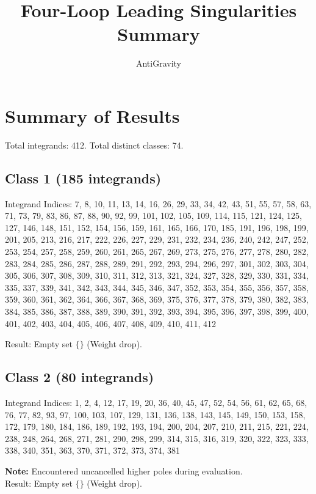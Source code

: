 \documentclass[11pt,a4paper]{article}
\title{Four-Loop Leading Singularities Summary}
\author{AntiGravity}
\begin{document}
\maketitle

\section{Summary of Results}
Total integrands: 412. Total distinct classes: 74.

\subsection*{Class 1 (185 integrands)}
Integrand Indices: 7, 8, 10, 11, 13, 14, 16, 26, 29, 33, 34, 42, 43, 51, 55, 57, 58, 63, 71, 73, 79, 83, 86, 87, 88, 90, 92, 99, 101, 102, 105, 109, 114, 115, 121, 124, 125, 127, 146, 148, 151, 152, 154, 156, 159, 161, 165, 166, 170, 185, 191, 196, 198, 199, 201, 205, 213, 216, 217, 222, 226, 227, 229, 231, 232, 234, 236, 240, 242, 247, 252, 253, 254, 257, 258, 259, 260, 261, 265, 267, 269, 273, 275, 276, 277, 278, 280, 282, 283, 284, 285, 286, 287, 288, 289, 291, 292, 293, 294, 296, 297, 301, 302, 303, 304, 305, 306, 307, 308, 309, 310, 311, 312, 313, 321, 324, 327, 328, 329, 330, 331, 334, 335, 337, 339, 341, 342, 343, 344, 345, 346, 347, 352, 353, 354, 355, 356, 357, 358, 359, 360, 361, 362, 364, 366, 367, 368, 369, 375, 376, 377, 378, 379, 380, 382, 383, 384, 385, 386, 387, 388, 389, 390, 391, 392, 393, 394, 395, 396, 397, 398, 399, 400, 401, 402, 403, 404, 405, 406, 407, 408, 409, 410, 411, 412

Result: Empty set $\{\}$ (Weight drop).\\[1em]

\subsection*{Class 2 (80 integrands)}
Integrand Indices: 1, 2, 4, 12, 17, 19, 20, 36, 40, 45, 47, 52, 54, 56, 61, 62, 65, 68, 76, 77, 82, 93, 97, 100, 103, 107, 129, 131, 136, 138, 143, 145, 149, 150, 153, 158, 172, 179, 180, 184, 186, 189, 192, 193, 194, 200, 204, 207, 210, 211, 215, 221, 224, 238, 248, 264, 268, 271, 281, 290, 298, 299, 314, 315, 316, 319, 320, 322, 323, 333, 338, 340, 351, 363, 370, 371, 372, 373, 374, 381

\textbf{Note:} Encountered uncancelled higher poles during evaluation.\\[1em]

Result: Empty set $\{\}$ (Weight drop).\\[1em]
\end{document}
